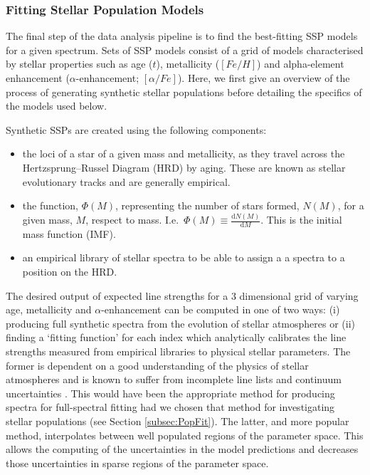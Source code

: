 		\subsubsection{Fitting Stellar Population Models}
			\label{subsubsec:StellarPop}
			The final step of the data analysis pipeline is to find the best-fitting SSP models for a given spectrum. Sets of SSP models consist of a grid of models characterised by stellar properties such as age ($t$), metallicity ($[Fe/H]$) and alpha-element enhancement ($\alpha$-enhancement; $[\alpha/Fe]$). Here, we first give an overview of the process of generating synthetic stellar populations before detailing the specifics of the models used below. 

			Synthetic SSPs are created using the following components:
			\begin{itemize}
				\item the loci of a star of a given mass and metallicity, as they travel across the Hertzsprung--Russel Diagram (HRD) by aging. These are known as stellar evolutionary tracks and are generally empirical.
				\item the function, $\Phi(M)$, representing the number of stars formed, $N(M)$, for a given mass, $M$, respect to mass. I.e.\ $\Phi(M) \equiv \frac{\mathrm{d}N(M)}{\mathrm{d}M}$. This is the initial mass function (IMF).
				\item an empirical library of stellar spectra to be able to assign a a spectra to a position on the HRD. 
			\end{itemize}
			The desired output of expected line strengths for a 3 dimensional grid of varying age, metallicity and $\alpha$-enhancement can be computed in one of two ways: (i) producing full synthetic spectra from the evolution of stellar atmospheres or (ii) finding a `fitting function' for each index which analytically calibrates the line strengths measured from empirical libraries to physical stellar parameters. The former is dependent on a good understanding of the physics of stellar atmospheres and is known to suffer from incomplete line lists and continuum uncertainties \citep{Thomas2004}. This would have been the appropriate method for producing spectra for full-spectral fitting had we chosen that method for investigating stellar populations (see Section \ref{subsec:PopFit}). The latter, and more popular method, interpolates between well populated regions of the parameter space. This allows the computing of the uncertainties in the model predictions and decreases those uncertainties in sparse regions of the parameter space. 

